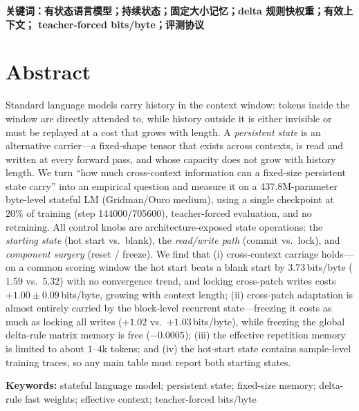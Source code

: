 \vspace{0.6em}
\noindent\textbf{关键词：有状态语言模型；持续状态；固定大小记忆；delta 规则快权重；有效上下文；
teacher-forced bits/byte；评测协议}

\vspace{1.0em}
\section*{Abstract}

Standard language models carry history in the context window: tokens inside the window are directly
attended to, while history outside it is either invisible or must be replayed at a cost that grows with
length. A \emph{persistent state} is an alternative carrier---a fixed-shape tensor that exists across
contexts, is read and written at every forward pass, and whose capacity does not grow with history
length. We turn ``how much cross-context information can a fixed-size persistent state carry'' into an
empirical question and measure it on a 437.8M-parameter byte-level stateful LM (Gridman/Ouro medium),
using a single checkpoint at $20\%$ of training (step 144000/705600), teacher-forced evaluation, and no
retraining. All control knobs are architecture-exposed state operations: the \emph{starting state}
(hot start vs.\ blank), the \emph{read/write path} (commit vs.\ lock), and \emph{component surgery}
(reset / freeze). We find that (i) cross-context carriage holds---on a common scoring window the hot
start beats a blank start by $3.73$\,bits/byte ($1.59$ vs.\ $5.32$) with no convergence trend, and
locking cross-patch writes costs $+1.00\pm0.09$\,bits/byte, growing with context length;
(ii) cross-patch adaptation is almost entirely carried by the block-level recurrent state---freezing it
costs as much as locking all writes ($+1.02$ vs.\ $+1.03$\,bits/byte), while freezing the global
delta-rule matrix memory is free ($-0.0005$); (iii) the effective repetition memory is limited to about
$1$--$4$k tokens; and (iv) the hot-start state contains sample-level training traces, so any main table
must report both starting states.

\vspace{0.6em}
\noindent\textbf{Keywords:} stateful language model; persistent state; fixed-size memory; delta-rule fast
weights; effective context; teacher-forced bits/byte
